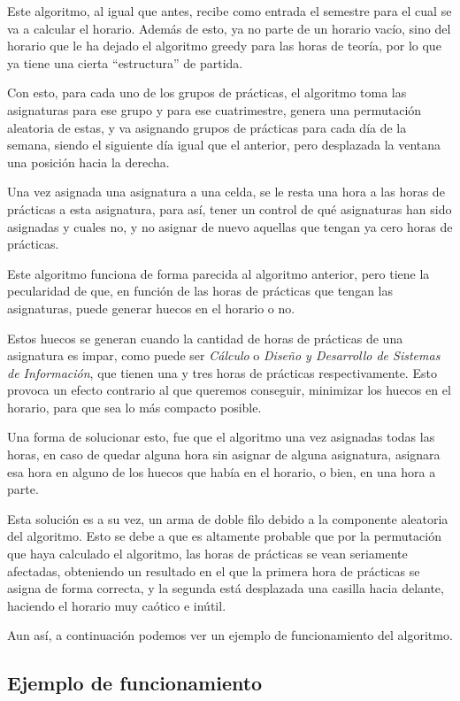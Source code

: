 Este algoritmo, al igual que antes, recibe como entrada el semestre para el cual se va a calcular el horario. Además de esto, ya no parte de un horario vacío, sino del horario que le ha dejado el algoritmo greedy para las horas de teoría, por lo que ya tiene una cierta ``estructura'' de partida.

Con esto, para cada uno de los grupos de prácticas, el algoritmo toma las asignaturas para ese grupo y para ese cuatrimestre, genera una permutación aleatoria de estas, y va asignando grupos de prácticas para cada día de la semana, siendo el siguiente día igual que el anterior, pero desplazada la ventana una posición hacia la derecha.

Una vez asignada una asignatura a una celda, se le resta una hora a las horas de prácticas a esta asignatura, para así, tener un control de qué asignaturas han sido asignadas y cuales no, y no asignar de nuevo aquellas que tengan ya cero horas de prácticas.

Este algoritmo funciona de forma parecida al algoritmo anterior, pero tiene la pecularidad de que, en función de las horas de prácticas que tengan las asignaturas, puede generar huecos en el horario o no. 

Estos huecos se generan cuando la cantidad de horas de prácticas de una asignatura es impar, como puede ser \textit{Cálculo} o \textit{Diseño y Desarrollo de Sistemas de Información}, que tienen una y tres horas de prácticas respectivamente. Esto provoca un efecto contrario al que queremos conseguir, minimizar los huecos en el horario, para que sea lo más compacto posible. 

Una forma de solucionar esto, fue que el algoritmo una vez asignadas todas las horas, en caso de quedar alguna hora sin asignar de alguna asignatura, asignara esa hora en alguno de los huecos que había en el horario, o bien, en una hora a parte. 

Esta solución es a su vez, un arma de doble filo debido a la componente aleatoria del algoritmo. Esto se debe a que es altamente probable que por la permutación que haya calculado el algoritmo, las horas de prácticas se vean seriamente afectadas, obteniendo un resultado en el que la primera hora de prácticas se asigna de forma correcta, y la segunda está desplazada una casilla hacia delante, haciendo el horario muy caótico e inútil.

Aun así, a continuación podemos ver un ejemplo de funcionamiento del algoritmo. 

\subsection{Ejemplo de funcionamiento}

